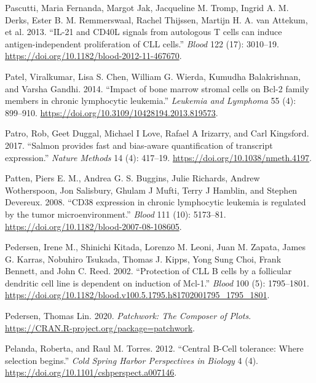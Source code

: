 \documentclass[11pt, a4paper, twosided]{book}
\newenvironment{CSLReferences}%
  {}%
  {\par}
\begin{document}
\begin{CSLReferences}{1}{0}
\leavevmode{}%
Pascutti, Maria Fernanda, Margot Jak, Jacqueline M. Tromp, Ingrid A. M. Derks, Ester B. M. Remmerswaal, Rachel Thijssen, Martijn H. A. van Attekum, et al. 2013. {``{IL-21 and CD40L signals from autologous T cells can induce antigen-independent proliferation of CLL cells}.''} \emph{Blood} 122 (17): 3010--19. \url{https://doi.org/10.1182/blood-2012-11-467670}.

\leavevmode{}%
Patel, Viralkumar, Lisa S. Chen, William G. Wierda, Kumudha Balakrishnan, and Varsha Gandhi. 2014. {``{Impact of bone marrow stromal cells on Bcl-2 family members in chronic lymphocytic leukemia}.''} \emph{Leukemia and Lymphoma} 55 (4): 899--910. \url{https://doi.org/10.3109/10428194.2013.819573}.

\leavevmode{}%
Patro, Rob, Geet Duggal, Michael I Love, Rafael A Irizarry, and Carl Kingsford. 2017. {``{Salmon provides fast and bias-aware quantification of transcript expression}.''} \emph{Nature Methods} 14 (4): 417--19. \url{https://doi.org/10.1038/nmeth.4197}.

\leavevmode{}%
Patten, Piers E. M., Andrea G. S. Buggins, Julie Richards, Andrew Wotherspoon, Jon Salisbury, Ghulam J Mufti, Terry J Hamblin, and Stephen Devereux. 2008. {``{CD38 expression in chronic lymphocytic leukemia is regulated by the tumor microenvironment}.''} \emph{Blood} 111 (10): 5173--81. \url{https://doi.org/10.1182/blood-2007-08-108605}.

\leavevmode{}%
Pedersen, Irene M., Shinichi Kitada, Lorenzo M. Leoni, Juan M. Zapata, James G. Karras, Nobuhiro Tsukada, Thomas J. Kipps, Yong Sung Choi, Frank Bennett, and John C. Reed. 2002. {``{Protection of CLL B cells by a follicular dendritic cell line is dependent on induction of Mcl-1}.''} \emph{Blood} 100 (5): 1795--1801. \url{https://doi.org/10.1182/blood.v100.5.1795.h81702001795_1795_1801}.

\leavevmode{}%
Pedersen, Thomas Lin. 2020. \emph{Patchwork: The Composer of Plots}. \url{https://CRAN.R-project.org/package=patchwork}.

\leavevmode{}%
Pelanda, Roberta, and Raul M. Torres. 2012. {``{Central B-Cell tolerance: Where selection begins}.''} \emph{Cold Spring Harbor Perspectives in Biology} 4 (4). \url{https://doi.org/10.1101/cshperspect.a007146}.


\end{CSLReferences}
\end{document}
